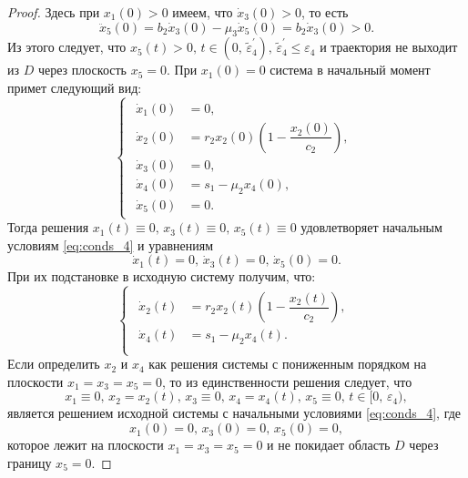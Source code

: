 \documentclass[14pt,a4paper]{extarticle}
\begin{document}
\begin{proof}
		Здесь при $x_1(0)>0$ имеем, что $\dot{x}_3(0)>0$, то есть
		\[\ddot{x}_5(0)=b_2\dot{x}_3(0)-\mu_3\dot{x}_5(0)=b_2\dot{x}_3(0)>0.\] 
		Из этого следует, что $x_5(t)>0,\, t\in(0,\, \tilde{\varepsilon}^\prime_4),\,\tilde{\varepsilon}^\prime_4\le\varepsilon_4$ и траектория не выходит из $D$ через плоскость $x_5=0$. При $x_1(0)=0$ система в начальный момент примет следующий вид:
		\begin{equation*}
			\begin{cases}
				\begin{aligned}
					\dot{x}_1(0) &= 0,\\
					\dot{x}_2(0) &= r_2x_2(0)\left(1-\dfrac{x_2(0)}{c_2}\right),\\
					\dot{x}_3(0) &= 0,\\ 
					\dot{x}_4(0) &= s_1-\mu_2x_4(0),\\
					\dot{x}_5(0) &= 0.
				\end{aligned}
			\end{cases}
		\end{equation*}
		Тогда решения $x_1(t)\equiv0,\, x_3(t)\equiv0,\, x_5(t)\equiv0$ удовлетворяет начальным условиям \ref{eq:conds_4} и уравнениям 
		\[\dot{x}_1(t)=0,\, \dot{x}_3(t)=0,\, \dot{x}_5(0)=0.\] 
		При их подстановке в исходную систему получим, что:
		\begin{equation*}
			\begin{cases}
				\begin{aligned}
					\dot{x}_2(t) &= r_2x_2(t)\left(1-\dfrac{x_2(t)}{c_2}\right),\\
					\dot{x}_4(t) &= s_1-\mu_2x_4(t).\\
				\end{aligned}
			\end{cases}
		\end{equation*}
		Если определить $x_2$ и $x_4$ как решения системы с пониженным порядком на плоскости $x_1=x_3=x_5=0$, то из единственности решения следует, что
		\[x_1\equiv0,\, x_2=x_2(t),\, x_3\equiv0,\, x_4=x_4(t),\, x_5\equiv0,\, t\in[0,\,\varepsilon_4),\]
		является решением исходной системы с начальными условиями \ref{eq:conds_4}, где
		\[x_1(0)=0,\, x_3(0)=0,\, x_5(0)=0,\]
		которое лежит на плоскости $x_1=x_3=x_5=0$ и не покидает область $D$ через границу $x_5=0$.
		
		

\end{proof}
\end{document}
